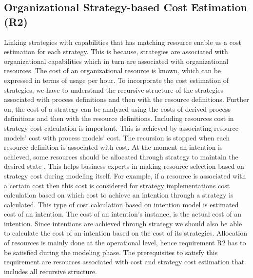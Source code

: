 \subsection{Organizational Strategy-based Cost Estimation (R2)}
Linking strategies with capabilities that has matching resource enable us a cost estimation for each strategy. This is because, strategies are associated with organizational capabilities which in turn are associated with organizational resources. The cost of an organizational resource is known, which can be expressed in terms of usage per hour. To incorporate the cost estimation of strategies, we have to understand the recursive structure of the strategies associated with process definitions and then with the resource definitions. Further on, the cost of a strategy can be analyzed using the costs of derived process definitions and then with the resource definitions. Including resources cost in strategy cost calculation is important. This is achieved by associating resource models' cost with process models' cost. The recursion is stopped when each resource definition is associated with cost. At the moment an intention is achieved, some resources should be allocated through strategy to maintain the desired state \cite{Mandic2010}. This helps business experts in making resource selection based on strategy cost during modeling itself. For example, if a resource is associated with a certain cost then this cost is considered for strategy implementations cost calculation based on which cost to achieve an intention through a strategy is calculated. This type of cost calculation based on intention model is estimated cost of an intention. The cost of an intention's instance, is the actual cost of an intention. Since intentions are achieved through strategy we should also be able to calculate the cost of an intention based on the cost of its strategies. Allocation of resources is mainly done at the operational level, hence requirement R2 has to be satisfied during the modeling phase. The prerequisites to satisfy this requirement are resources associated with cost and strategy cost estimation that includes all recursive structure.

